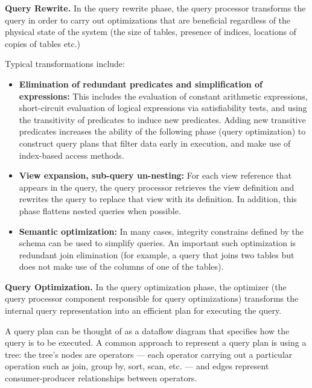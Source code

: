 \bigskip
\noindent
\textbf{Query Rewrite.}
In the query rewrite phase, the query processor transforms the query in order to carry out optimizations that are
beneficial regardless of the physical state of the system
(the size of tables, presence of indices, locations of copies of tables etc.)

Typical transformations include:
\begin{itemize}

  \item \textbf{Elimination of redundant predicates and simplification of expressions:}
  This includes the evaluation of constant arithmetic expressions,
  short-circuit evaluation of logical expressions via satisfiability tests,
  and using the transitivity of predicates to induce new predicates.
  Adding new transitive predicates increases the ability of the following phase (query optimization) to construct query
  plans that filter data early in execution, and make use of index-based access methods.

  \item \textbf{View expansion, sub-query un-nesting:}
  For each view reference that appears in the query, the query processor retrieves the view definition and rewrites the
  query to replace that view with its definition.
  In addition, this phase flattens nested queries when possible.

  \item \textbf{Semantic optimization:}
  In many cases, integrity constrains defined by the schema can be used to simplify queries.
  An important such optimization is redundant join elimination (for example, a query that joins two tables but does not
  make use of the columns of one of the tables).

\end{itemize}

\bigskip
\noindent
\textbf{Query Optimization.}
In the query optimization phase, the optimizer (the query processor component responsible for query optimizations)
transforms the internal query representation into an efficient plan for executing the query.

A query plan can be thought of as a dataflow diagram that specifies how the query is to be executed.
A common approach to represent a query plan is using a tree:
the tree's nodes are operators
--- each operator carrying out a particular operation such as join, group by, sort, scan, etc. ---
and edges represent consumer-producer relationships between operators.


